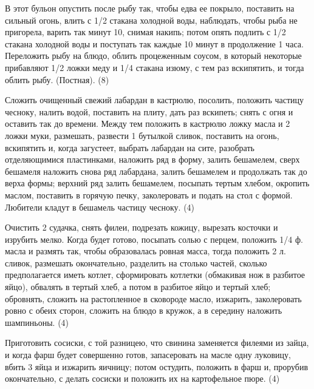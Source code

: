 В этот бульон опустить после рыбу так, чтобы едва ее покрыло, поставить на сильный огонь, влить с 1/2 стакана холодной воды, наблюдать, чтобы рыба не пригорела, варить так минут 10, снимая накипь; потом опять подлить с 1/2 стакана холодной воды и поступать так каждые 10 минут в продолжение 1 часа. Переложить рыбу на блюдо, облить процеженным соусом, в который некоторые прибавляют 1/2 ложки меду и 1/4 стакана изюму, с тем раз вскипятить, и тогда облить рыбу. (Постная). (8) 


Сложить очищенный свежий лабардан в кастрюлю, посолить, положить частицу чесноку, налить водой, поставить на плиту, дать раз вскипеть; снять с огня и оставить так до времени. Между тем положить в кастрюлю ложку масла и 2 ложки муки, размешать, развести 1 бутылкой сливок, поставить на огонь, вскипятить и, когда загустеет, выбрать лабардан на сите, разобрать отделяющимися пластинками, наложить ряд в форму, залить бешамелем, сверх бешамеля наложить снова ряд лабардана, залить бешамелем и продолжать так до верха формы; верхний ряд залить бешамелем, посыпать тертым хлебом, окропить маслом, поставить в горячую печку, заколеровать и подать на стол с формой. Любители кладут в бешамель частицу чесноку. (4) 


Очистить 2 судачка, снять филеи, подрезать кожицу, вырезать косточки и изрубить мелко. Когда будет готово, посыпать солью с перцем, положить 1/4 ф. масла и размять так, чтобы образовалась ровная масса, тогда положить 2 л. сливок, размешать окончательно, разделить на столько частей, сколько предполагается иметь котлет, сформировать котлетки (обмакивая нож в разбитое яйцо), обвалять в тертый хлеб, а потом в разбитое яйцо и тертый хлеб; обровнять, сложить на растопленное в сковороде масло, изжарить, заколеровать ровно с обеих сторон, сложить на блюдо в кружок, а в середину наложить шампиньоны. (4) 


Приготовить сосиски, с той разницею, что свинина заменяется филеями из зайца, и когда фарш будет совершенно готов, запасеровать на масле одну луковицу, вбить 3 яйца и изжарить яичницу; потом остудить, положить в фарш и, прорубив окончательно, с делать сосиски и положить их на картофельное пюре. (4)


